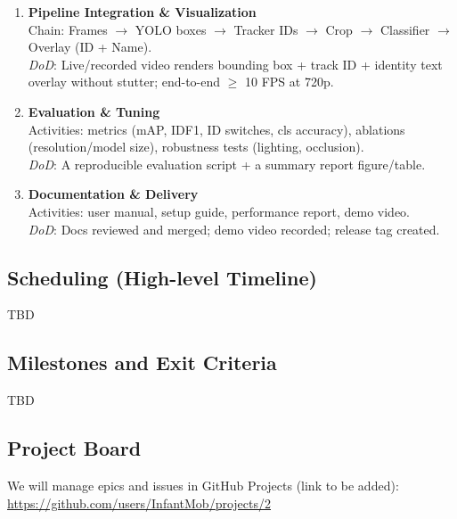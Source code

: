 \documentclass{article}
\begin{document}
\begin{enumerate}
  \item \textbf{Pipeline Integration \& Visualization} \\
  Chain: Frames $\rightarrow$ YOLO boxes $\rightarrow$ Tracker IDs $\rightarrow$ Crop $\rightarrow$ Classifier $\rightarrow$ Overlay (ID + Name). \\
  \emph{DoD}: Live/recorded video renders bounding box + track ID + identity text overlay without stutter; end-to-end $\geq$ 10 FPS at 720p.

  \item \textbf{Evaluation \& Tuning} \\
  Activities: metrics (mAP, IDF1, ID switches, cls accuracy), ablations (resolution/model size), robustness tests (lighting, occlusion). \\
  \emph{DoD}: A reproducible evaluation script + a summary report figure/table.

  \item \textbf{Documentation \& Delivery} \\
  Activities: user manual, setup guide, performance report, demo video. \\
  \emph{DoD}: Docs reviewed and merged; demo video recorded; release tag created.
\end{enumerate}

\subsection*{Scheduling (High-level Timeline)}
{\color{red} TBD}

\subsection*{Milestones and Exit Criteria}
{\color{red} TBD}

\subsection*{Project Board}
We will manage epics and issues in GitHub Projects (link to be added): \\
\url{https://github.com/users/InfantMob/projects/2}

\end{document}
